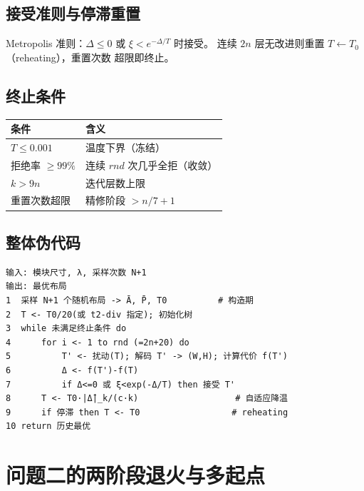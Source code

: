 \documentclass[12pt,a4paper]{article}
\begin{document}
\subsection{接受准则与停滞重置}

Metropolis 准则：$\Delta \le 0$ 或 $\xi < e^{-\Delta/T}$ 时接受。
连续 $2n$ 层无改进则重置 $T \leftarrow T_0$（reheating），重置次数
超限即终止。

\subsection{终止条件}

\begin{table}[H]
\centering
\small
\begin{tabular}{ll}
\toprule
条件 & 含义 \\
\midrule
$T \le 0.001$ & 温度下界（冻结） \\
拒绝率 $\ge 99\%$ & 连续 $rnd$ 次几乎全拒（收敛） \\
$k > 9n$ & 迭代层数上限 \\
重置次数超限 & 精修阶段 $> n/7 + 1$ \\
\bottomrule
\end{tabular}
\end{table}

\subsection{整体伪代码}

\begin{tcolorbox}[colback=blue!5, colframe=blue!50, title=算法 1：B$^*$ 树 + 快速模拟退火]
{\small
\begin{verbatim}
输入: 模块尺寸, λ, 采样次数 N+1
输出: 最优布局
1  采样 N+1 个随机布局 -> Ā, P̄, T0          # 构造期
2  T <- T0/20(或 t2-div 指定); 初始化树
3  while 未满足终止条件 do
4      for i <- 1 to rnd (=2n+20) do
5          T' <- 扰动(T); 解码 T' -> (W,H); 计算代价 f(T')
6          Δ <- f(T')-f(T)
7          if Δ<=0 或 ξ<exp(-Δ/T) then 接受 T'
8      T <- T0·|Δ̄|_k/(c·k)                   # 自适应降温
9      if 停滞 then T <- T0                  # reheating
10 return 历史最优
\end{verbatim}
}
\end{tcolorbox}

\section{问题二的两阶段退火与多起点}
\end{document}
